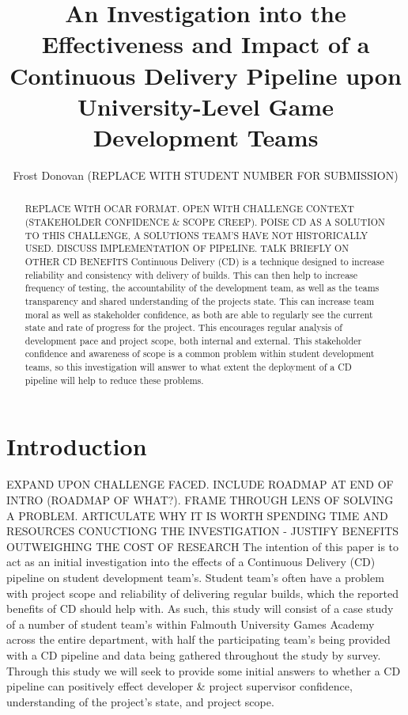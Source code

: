\documentclass[journal]{IEEEtran}
\begin{document}
\title{An Investigation into the Effectiveness and Impact of a Continuous Delivery Pipeline upon University-Level Game Development Teams}

\author{Frost Donovan (REPLACE WITH STUDENT NUMBER FOR SUBMISSION)}

\maketitle

\begin{abstract}
    REPLACE WITH OCAR FORMAT. OPEN WITH CHALLENGE CONTEXT (STAKEHOLDER CONFIDENCE \& SCOPE CREEP). POISE CD AS A SOLUTION TO THIS CHALLENGE, A SOLUTIONS TEAM'S HAVE NOT HISTORICALLY USED. DISCUSS IMPLEMENTATION OF PIPELINE. TALK BRIEFLY ON OTHER CD BENEFITS
    Continuous Delivery (CD) is a technique designed to increase reliability and consistency with delivery of builds. This can then help to increase frequency of testing, the accountability of the development team, as well as the teams transparency and shared understanding of the projects state. This can increase team moral as well as stakeholder confidence, as both are able to regularly see the current state and rate of progress for the project. This encourages regular analysis of development pace and project scope, both internal and external. This stakeholder confidence and awareness of scope is a common problem within student development teams, so this investigation will answer to what extent the deployment of a CD pipeline will help to reduce these problems.
\end{abstract}

\section{Introduction}
EXPAND UPON CHALLENGE FACED. INCLUDE ROADMAP AT END OF INTRO (ROADMAP OF WHAT?). FRAME THROUGH LENS OF SOLVING A PROBLEM. ARTICULATE WHY IT IS WORTH SPENDING TIME AND RESOURCES CONUCTIONG THE INVESTIGATION - JUSTIFY BENEFITS OUTWEIGHING THE COST OF RESEARCH
The intention of this paper is to act as an initial investigation into the effects of a Continuous Delivery (CD) pipeline on student development team's. Student team's often have a problem with project scope and reliability of delivering regular builds, which the reported benefits of CD should help with. As such, this study will consist of a case study of a number of student team's within Falmouth University Games Academy across the entire department, with half the participating team's being provided with a CD pipeline and data being gathered throughout the study by survey. Through this study we will seek to provide some initial answers to whether a CD pipeline can positively effect developer \& project supervisor confidence, understanding of the project's state, and project scope.
\end{document}
